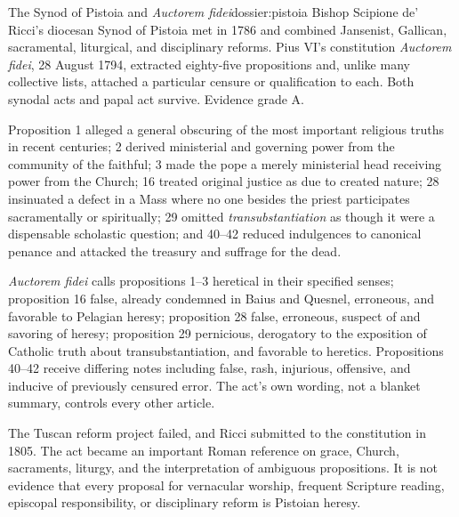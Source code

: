 \begin{heresydossier}{The Synod of Pistoia and \emph{Auctorem fidei}}{dossier:pistoia}
\objectfield Bishop Scipione de' Ricci's diocesan Synod of Pistoia met in 1786 and combined Jansenist, Gallican, sacramental, liturgical, and disciplinary reforms. Pius VI's constitution \emph{Auctorem fidei}, 28 August 1794, extracted eighty-five propositions and, unlike many collective lists, attached a particular censure or qualification to each. Both synodal acts and papal act survive. Evidence grade A.

\propositionfield Proposition 1 alleged a general obscuring of the most important religious truths in recent centuries; 2 derived ministerial and governing power from the community of the faithful; 3 made the pope a merely ministerial head receiving power from the Church; 16 treated original justice as due to created nature; 28 insinuated a defect in a Mass where no one besides the priest participates sacramentally or spiritually; 29 omitted \emph{transubstantiation} as though it were a dispensable scholastic question; and 40--42 reduced indulgences to canonical penance and attacked the treasury and suffrage for the dead.

\responsefield \emph{Auctorem fidei} calls propositions 1--3 heretical in their specified senses; proposition 16 false, already condemned in Baius and Quesnel, erroneous, and favorable to Pelagian heresy; proposition 28 false, erroneous, suspect of and savoring of heresy; proposition 29 pernicious, derogatory to the exposition of Catholic truth about transubstantiation, and favorable to heretics. Propositions 40--42 receive differing notes including false, rash, injurious, offensive, and inducive of previously censured error. The act's own wording, not a blanket summary, controls every other article.

\aftermathfield The Tuscan reform project failed, and Ricci submitted to the constitution in 1805. The act became an important Roman reference on grace, Church, sacraments, liturgy, and the interpretation of ambiguous propositions. It is not evidence that every proposal for vernacular worship, frequent Scripture reading, episcopal responsibility, or disciplinary reform is Pistoian heresy.
\end{heresydossier}

